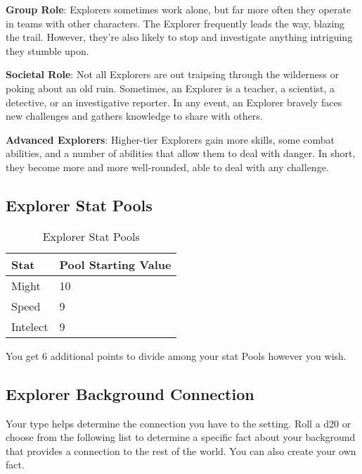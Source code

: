 \begin{multicols}{2}
\textbf{Group Role}: Explorers sometimes work alone, but far more often they operate in teams with other characters. The Explorer frequently leads the way, blazing the trail. However, they’re also likely to stop and investigate anything intriguing they stumble upon. 

\textbf{Societal Role}: Not all Explorers are out traipsing through the wilderness or poking about an old ruin. Sometimes, an Explorer is a teacher, a scientist, a detective, or an investigative reporter. In any event, an Explorer bravely faces new challenges and gathers knowledge to share with others.

\textbf{Advanced Explorers}: Higher-tier Explorers gain more skills, some combat abilities, and a number of abilities that allow them to deal with danger. In short, they become more and more well-rounded, able to deal with any challenge.

\subsection{Explorer Stat Pools}

\begin{table}[H]
\centering
\caption{Explorer Stat Pools}
\label{tab: Explorer Stat Pools}

\begin{tabularx}{\linewidth}{| X | X |}
\hline
\textbf{Stat} & \textbf{Pool Starting Value} \\
\hline
Might & 10 \\ \hline
Speed & 9 \\ \hline
Intelect & 9  \\ \hline

\end{tabularx}

\end{table}

\raggedright

You get 6 additional points to divide among your stat Pools however you wish.

\subsection{Explorer Background Connection}

Your type helps determine the connection you have to the setting. Roll a d20 or choose from the following list to determine a specific fact about your background that provides a connection to the rest of the world. You can also create your own fact.


\end{multicols}
